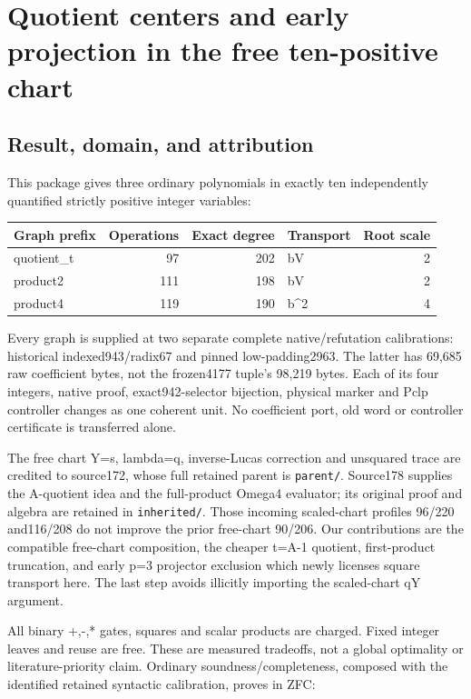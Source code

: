 \section{Quotient centers and early projection in the free ten-positive
chart}\label{quotient-centers-and-early-projection-in-the-free-ten-positive-chart}

\subsection{Result, domain, and
attribution}\label{result-domain-and-attribution}

This package gives three ordinary polynomials in exactly ten
independently quantified strictly positive integer variables:

\begin{longtable}[]{@{}lrrlr@{}}
\toprule\noalign{}
Graph prefix & Operations & Exact degree & Transport & Root scale \\
\midrule\noalign{}
\endhead
\bottomrule\noalign{}
\endlastfoot
quotient\_t & 97 & 202 & bV & 2 \\
product2 & 111 & 198 & bV & 2 \\
product4 & 119 & 190 & b\^{}2 & 4 \\
\end{longtable}

Every graph is supplied at two separate complete native/refutation
calibrations: historical indexed943/radix67 and pinned low-padding2963.
The latter has 69,685 raw coefficient bytes, not the frozen4177 tuple's
98,219 bytes. Each of its four integers, native proof, exact942-selector
bijection, physical marker and Pclp controller changes as one coherent
unit. No coefficient port, old word or controller certificate is
transferred alone.

The free chart Y=s, lambda=q, inverse-Lucas correction and unsquared
trace are credited to source172, whose full retained parent is
\texttt{parent/}. Source178 supplies the A-quotient idea and the
full-product Omega4 evaluator; its original proof and algebra are
retained in \texttt{inherited/}. Those incoming scaled-chart profiles
96/220 and116/208 do not improve the prior free-chart 90/206. Our
contributions are the compatible free-chart composition, the cheaper
t=A-1 quotient, first-product truncation, and early p=3 projector
exclusion which newly licenses square transport here. The last step
avoids illicitly importing the scaled-chart q\textbar Y argument.

All binary +,-,* gates, squares and scalar products are charged. Fixed
integer leaves and reuse are free. These are measured tradeoffs, not a
global optimality or literature-priority claim. Ordinary
soundness/completeness, composed with the identified retained syntactic
calibration, proves in ZFC:

